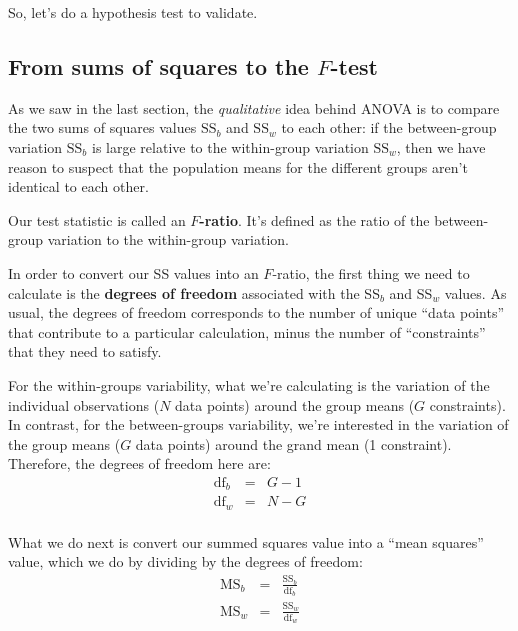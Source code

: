 \documentclass[
]{book}
\theoremstyle{definition}
\theoremstyle{definition}
\theoremstyle{definition}
\theoremstyle{definition}
\theoremstyle{remark}
\begin{document}
So, let's do a hypothesis test to validate.

\hypertarget{from-sums-of-squares-to-the-f-test}{%
\subsection{\texorpdfstring{From sums of squares to the \(F\)-test}{From sums of squares to the F-test}}\label{from-sums-of-squares-to-the-f-test}}

As we saw in the last section, the \emph{qualitative} idea behind ANOVA is to compare the two sums of squares values \(\mbox{SS}_ b\) and \(\mbox{SS}_ w\) to each other: if the between-group variation \(\mbox{SS}_ b\) is large relative to the within-group variation \(\mbox{SS}_ w\), then we have reason to suspect that the population means for the different groups aren't identical to each other.

Our test statistic is called an \textbf{\(F\)-ratio}. It's defined as the ratio of the between-group variation to the within-group variation.

In order to convert our SS values into an \(F\)-ratio, the first thing we need to calculate is the \textbf{degrees of freedom} associated with the SS\(_b\) and SS\(_w\) values. As usual, the degrees of freedom corresponds to the number of unique ``data points'' that contribute to a particular calculation, minus the number of ``constraints'' that they need to satisfy.

For the within-groups variability, what we're calculating is the variation of the individual observations (\(N\) data points) around the group means (\(G\) constraints). In contrast, for the between-groups variability, we're interested in the variation of the group means (\(G\) data points) around the grand mean (1 constraint). Therefore, the degrees of freedom here are:
\[
\begin{array}{lcl}
\mbox{df}_b &=& G-1 \\
\mbox{df}_w &=& N-G \\
\end{array}
\]

What we do next is convert our summed squares value into a ``mean squares'' value, which we do by dividing by the degrees of freedom:
\[
\begin{array}{lcl}
\mbox{MS}_b &=& \displaystyle\frac{\mbox{SS}_b }{ \mbox{df}_b} \\
\mbox{MS}_w &=& \displaystyle\frac{\mbox{SS}_w }{ \mbox{df}_w} 
\end{array}
\]
\end{document}
